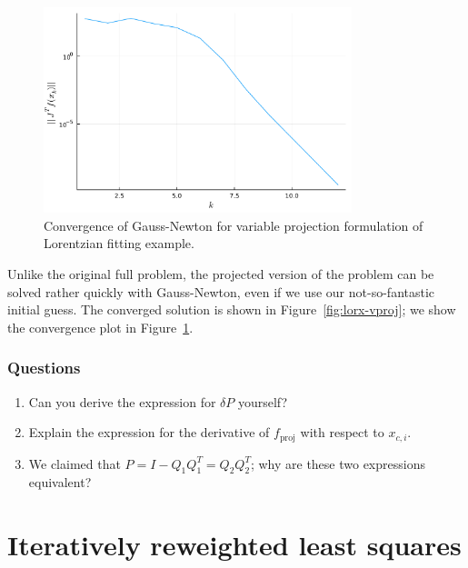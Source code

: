 \documentclass[12pt, leqno]{article} %
\providecommand{\tightlist}{%
  \setlength{\itemsep}{0pt}\setlength{\parskip}{0pt}}
\begin{document}
\begin{figure}
\begin{center}
  \includegraphics[width=0.8\textwidth]{fig/2023-04-10-lorx_vproj_cvg.pdf}
\end{center}
\caption{Convergence of Gauss-Newton for variable projection formulation of
  Lorentzian fitting example.}
\label{fig:lorx-vproj-cvg}
\end{figure}

Unlike the original full problem, the projected version of the problem can be
solved rather quickly with Gauss-Newton, even if we use our not-so-fantastic
initial guess.  The converged solution is shown in Figure~\ref{fig:lorx-vproj};
we show the convergence plot in Figure~\ref{fig:lorx-vproj-cvg}.

\subsubsection{Questions}

\begin{enumerate}
\def\labelenumi{\arabic{enumi}.}
\tightlist
\item
  Can you derive the expression for \(\delta P\) yourself?
\item
  Explain the expression for the derivative of \(f_{\mathrm{proj}}\)
  with respect to \(x_{c,i}\).
\item
  We claimed that \(P = I-Q_1 Q_1^T = Q_2 Q_2^T\); why are these two
  expressions equivalent?
\end{enumerate}

\section{Iteratively reweighted least squares}
\end{document}
